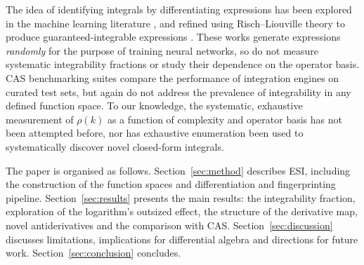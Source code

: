 \documentclass[preprint,12pt,authoryear]{elsarticle}
\newcommand{\rhok}{\rho(k)}
\newcommand{\hd}[1]{{\color{red}\textbf{[HD: #1]}}}
\begin{document}

The idea of identifying integrals by differentiating expressions
has been explored in the machine learning literature \citep{LampleCharton2020}, and refined using Risch--Liouville theory to produce guaranteed-integrable expressions \citep{BarketEG2023,BarketEG2024}. These works generate expressions \emph{randomly} for the purpose of training neural networks, so do not measure systematic integrability fractions or study their dependence on the operator basis. CAS benchmarking suites \citep{Nasser2024} compare the performance of integration engines on curated test sets, but again do not address the prevalence of integrability in any defined function space. To our knowledge, the systematic, exhaustive measurement of $\rhok$ as a function of complexity and operator basis has not been attempted before,
nor has exhaustive enumeration been used to systematically discover novel closed-form integrals.

The paper is organised as follows.  Section~\ref{sec:method}
describes ESI, including the construction of the function spaces and differentiation and
fingerprinting pipeline.
Section~\ref{sec:results} presents the main results: the integrability
fraction, exploration of the logarithm's outsized effect, the structure
of the derivative map, novel antiderivatives and the comparison with CAS.
Section~\ref{sec:discussion} discusses limitations, implications for differential algebra
and directions for future work. Section~\ref{sec:conclusion} concludes.
\end{document}
